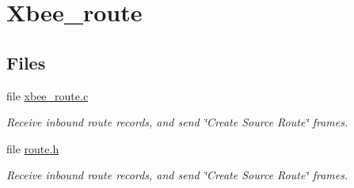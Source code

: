 \hypertarget{group__xbee__route}{\section{Xbee\-\_\-route}
\label{group__xbee__route}
}
\subsection*{Files}
\begin{DoxyCompactItemize}
\item 
file \hyperlink{xbee__route_8c}{xbee\-\_\-route.\-c}
\begin{DoxyCompactList}\small\item\em Receive inbound route records, and send \char`\"{}\-Create Source Route\char`\"{} frames. \end{DoxyCompactList}\item 
file \hyperlink{route_8h}{route.\-h}
\begin{DoxyCompactList}\small\item\em Receive inbound route records, and send \char`\"{}\-Create Source Route\char`\"{} frames. \end{DoxyCompactList}\end{DoxyCompactItemize}
